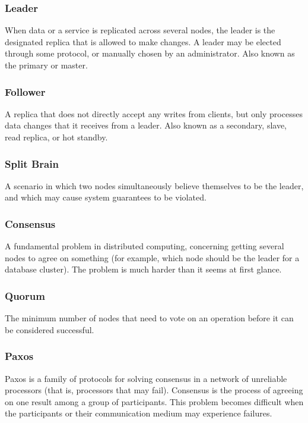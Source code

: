 \documentclass{article}
\begin{document}
    \subsubsection{Leader}
    When data or a service is replicated across several nodes, the leader is the designated replica that is allowed to make changes. A leader may be elected through some protocol, or manually chosen by an administrator. Also known as the primary or master.
    
    \subsubsection{Follower}
    A replica that does not directly accept any writes from clients, but only processes data changes that it receives from a leader. Also known as a secondary, slave, read replica, or hot standby.
    
    \subsubsection{Split Brain} 
    A scenario in which two nodes simultaneously believe themselves to be the leader, and which may cause system guarantees to be violated.
    
    \subsubsection{Consensus}
    A fundamental problem in distributed computing, concerning getting several nodes to agree on something (for example, which node should be the leader for a database cluster). The problem is much harder than it seems at first glance.
    
    \subsubsection{Quorum}
    The minimum number of nodes that need to vote on an operation before it can be considered successful.
    
    \subsubsection{Paxos}
    Paxos is a family of protocols for solving consensus in a network of unreliable processors (that is, processors that may fail). Consensus is the process of agreeing on one result among a group of participants. This problem becomes difficult when the participants or their communication medium may experience failures.
    
\end{document}
